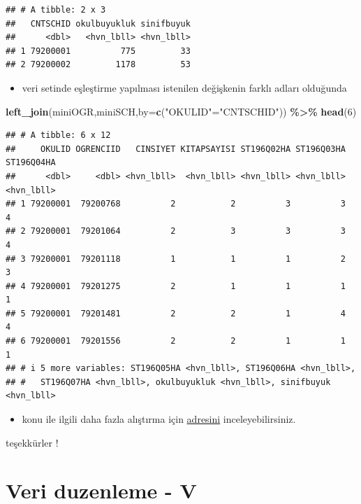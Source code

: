 \documentclass[
  oneside]{book}
\newenvironment{Shaded}{\begin{snugshade}}{\end{snugshade}}
\newcommand{\AttributeTok}[1]{\textcolor[rgb]{0.13,0.29,0.53}{#1}}
\newcommand{\DecValTok}[1]{\textcolor[rgb]{0.00,0.00,0.81}{#1}}
\newcommand{\FunctionTok}[1]{\textcolor[rgb]{0.13,0.29,0.53}{\textbf{#1}}}
\newcommand{\NormalTok}[1]{#1}
\newcommand{\OtherTok}[1]{\textcolor[rgb]{0.56,0.35,0.01}{#1}}
\newcommand{\SpecialCharTok}[1]{\textcolor[rgb]{0.81,0.36,0.00}{\textbf{#1}}}
\newcommand{\StringTok}[1]{\textcolor[rgb]{0.31,0.60,0.02}{#1}}
\providecommand{\tightlist}{%
  \setlength{\itemsep}{0pt}\setlength{\parskip}{0pt}}
\begin{document}
\begin{verbatim}
## # A tibble: 2 x 3
##   CNTSCHID okulbuyukluk sinifbuyuk
##      <dbl>   <hvn_lbll> <hvn_lbll>
## 1 79200001          775         33
## 2 79200002         1178         53
\end{verbatim}

\begin{itemize}
\tightlist
\item
  veri setinde eşleştirme yapılması istenilen değişkenin farklı adları olduğunda
\end{itemize}

\begin{Shaded}
\begin{Highlighting}[]
\FunctionTok{left\_join}\NormalTok{(miniOGR,miniSCH,}\AttributeTok{by=}\FunctionTok{c}\NormalTok{(}\StringTok{"OKULID"}\OtherTok{=}\StringTok{"CNTSCHID"}\NormalTok{)) }\SpecialCharTok{\%\textgreater{}\%} \FunctionTok{head}\NormalTok{(}\DecValTok{6}\NormalTok{)}
\end{Highlighting}
\end{Shaded}

\begin{verbatim}
## # A tibble: 6 x 12
##     OKULID OGRENCIID   CINSIYET KITAPSAYISI ST196Q02HA ST196Q03HA ST196Q04HA
##      <dbl>     <dbl> <hvn_lbll>  <hvn_lbll> <hvn_lbll> <hvn_lbll> <hvn_lbll>
## 1 79200001  79200768          2           2          3          3          4
## 2 79200001  79201064          2           3          3          3          4
## 3 79200001  79201118          1           1          1          2          3
## 4 79200001  79201275          2           1          1          1          1
## 5 79200001  79201481          2           2          1          4          4
## 6 79200001  79201556          2           2          1          1          1
## # i 5 more variables: ST196Q05HA <hvn_lbll>, ST196Q06HA <hvn_lbll>,
## #   ST196Q07HA <hvn_lbll>, okulbuyukluk <hvn_lbll>, sinifbuyuk <hvn_lbll>
\end{verbatim}

\begin{itemize}
\tightlist
\item
  konu ile ilgili daha fazla alıştırma için \href{https://rpubs.com/williamsurles/293454}{adresini} inceleyebilirsiniz.
\end{itemize}

teşekkürler !

\hypertarget{veri-duzenleme---v}{%
\chapter{Veri duzenleme - V}\label{veri-duzenleme---v}}
\end{document}
